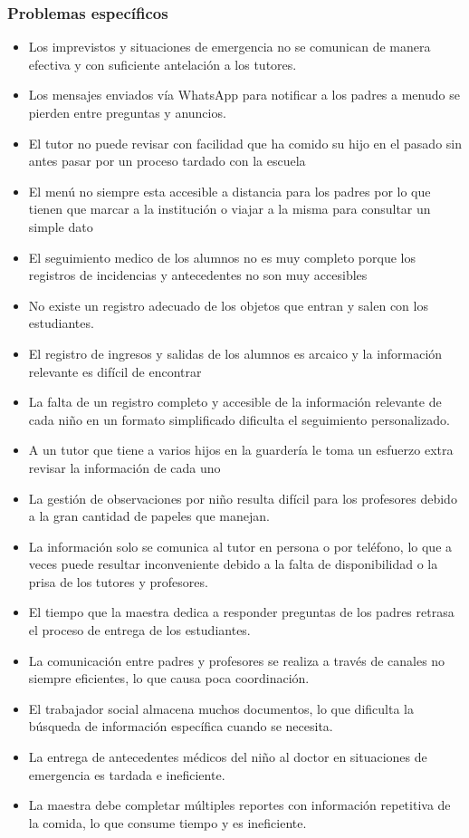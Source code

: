 \documentclass{article}
\begin{document}
\subsubsection{Problemas específicos}
\begin{itemize}
	\item Los imprevistos y situaciones de emergencia no se comunican de manera efectiva y con suficiente antelación a los tutores.
	\item Los mensajes enviados vía WhatsApp para notificar a los padres a menudo se pierden entre preguntas y anuncios.
	\item El tutor no puede revisar con facilidad que ha comido su hijo en el pasado sin antes pasar por un proceso tardado con la escuela
	\item El menú no siempre esta accesible a distancia para los padres por lo que tienen que marcar a la institución o viajar a la misma para consultar un simple dato
	\item El seguimiento medico de los alumnos no es muy completo porque los registros de  incidencias y antecedentes no son muy accesibles
	\item No existe un registro adecuado de los objetos que entran y salen con los estudiantes.
	\item El registro de ingresos y salidas de los alumnos es arcaico y la información relevante es difícil de encontrar
	\item La falta de un registro completo y accesible de la información relevante de cada niño en un formato simplificado dificulta el seguimiento personalizado.
	\item A un tutor que tiene a varios hijos en la guardería le toma un esfuerzo extra revisar la información de cada uno
	\item La gestión de observaciones por niño resulta difícil para los profesores debido a la gran cantidad de papeles que manejan.
	\item La información solo se comunica al tutor en persona o por teléfono, lo que a veces puede resultar inconveniente debido a la falta de disponibilidad o la prisa de los tutores y profesores.
	\item El tiempo que la maestra dedica a responder preguntas de los padres retrasa el proceso de entrega de los estudiantes.
	\item La comunicación entre padres y profesores se realiza a través de canales no siempre eficientes, lo que causa poca coordinación.
	\item El trabajador social almacena muchos documentos, lo que dificulta la búsqueda de información específica cuando se necesita.
	\item La entrega de antecedentes médicos del niño al doctor en situaciones de emergencia es tardada e ineficiente.
	\item La maestra debe completar múltiples reportes con información repetitiva de la comida, lo que consume tiempo y es ineficiente.
\end{itemize}
\end{document}

